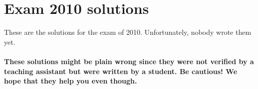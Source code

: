 \documentclass[main]{subfiles}
\begin{document}

\section{Exam 2010 solutions}
These are the solutions for the exam of 2010. Unfortunately, nobody wrote them yet.
\\\\
\textbf{These solutions might be plain wrong since they were not verified by a teaching assistant but were written by a student. Be cautious! We hope that they help you even though.}

\end{document}
